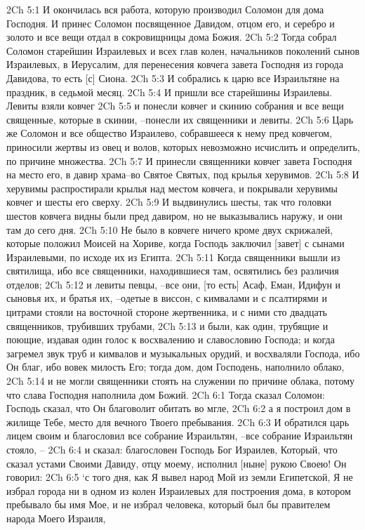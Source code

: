 2Ch 5:1  И окончилась вся работа, которую производил Соломон для дома Господня. И принес Соломон посвященное Давидом, отцом его, и серебро и золото и все вещи отдал в сокровищницы дома Божия.
2Ch 5:2  Тогда собрал Соломон старейшин Израилевых и всех глав колен, начальников поколений сынов Израилевых, в Иерусалим, для перенесения ковчега завета Господня из города Давидова, то есть [с] Сиона.
2Ch 5:3  И собрались к царю все Израильтяне на праздник, в седьмой месяц.
2Ch 5:4  И пришли все старейшины Израилевы. Левиты взяли ковчег
2Ch 5:5  и понесли ковчег и скинию собрания и все вещи священные, которые в скинии, --понесли их священники и левиты.
2Ch 5:6  Царь же Соломон и все общество Израилево, собравшееся к нему пред ковчегом, приносили жертвы из овец и волов, которых невозможно исчислить и определить, по причине множества.
2Ch 5:7  И принесли священники ковчег завета Господня на место его, в давир храма--во Святое Святых, под крылья херувимов.
2Ch 5:8  И херувимы распростирали крылья над местом ковчега, и покрывали херувимы ковчег и шесты его сверху.
2Ch 5:9  И выдвинулись шесты, так что головки шестов ковчега видны были пред давиром, но не выказывались наружу, и они там до сего дня.
2Ch 5:10  Не было в ковчеге ничего кроме двух скрижалей, которые положил Моисей на Хориве, когда Господь заключил [завет] с сынами Израилевыми, по исходе их из Египта.
2Ch 5:11  Когда священники вышли из святилища, ибо все священники, находившиеся там, освятились без различия отделов;
2Ch 5:12  и левиты певцы, --все они, [то есть] Асаф, Еман, Идифун и сыновья их, и братья их, --одетые в виссон, с кимвалами и с псалтирями и цитрами стояли на восточной стороне жертвенника, и с ними сто двадцать священников, трубивших трубами,
2Ch 5:13  и были, как один, трубящие и поющие, издавая один голос к восхвалению и славословию Господа; и когда загремел звук труб и кимвалов и музыкальных орудий, и восхваляли Господа, ибо Он благ, ибо вовек милость Его; тогда дом, дом Господень, наполнило облако,
2Ch 5:14  и не могли священники стоять на служении по причине облака, потому что слава Господня наполнила дом Божий.
2Ch 6:1  Тогда сказал Соломон: Господь сказал, что Он благоволит обитать во мгле,
2Ch 6:2  а я построил дом в жилище Тебе, место для вечного Твоего пребывания.
2Ch 6:3  И обратился царь лицем своим и благословил все собрание Израильтян, --все собрание Израильтян стояло, --
2Ch 6:4  и сказал: благословен Господь Бог Израилев, Который, что сказал устами Своими Давиду, отцу моему, исполнил [ныне] рукою Своею! Он говорил:
2Ch 6:5  `с того дня, как Я вывел народ Мой из земли Египетской, Я не избрал города ни в одном из колен Израилевых для построения дома, в котором пребывало бы имя Мое, и не избрал человека, который был бы правителем народа Моего Израиля,
